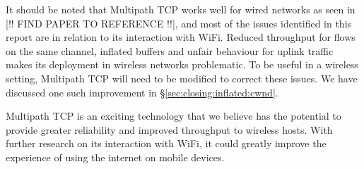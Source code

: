 It should be noted that Multipath TCP works well for wired 
networks as seen in [!! FIND PAPER TO REFERENCE !!], and most of the issues identified
in this report are in relation to its interaction with WiFi. Reduced throughput
for flows on the same channel, inflated buffers and unfair behaviour for uplink
traffic makes its deployment in wireless networks problematic. To be useful in a
wireless setting, Multipath TCP will need to be modified to correct these issues.
We have discussed one such improvement in
\S\ref{sec:closing:inflated:cwnd}.

Multipath TCP is an exciting technology that we believe has the potential to 
provide greater reliability and improved throughput to wireless hosts. With
further research on its interaction with WiFi, it could greatly improve the
experience of using the internet on mobile devices.

